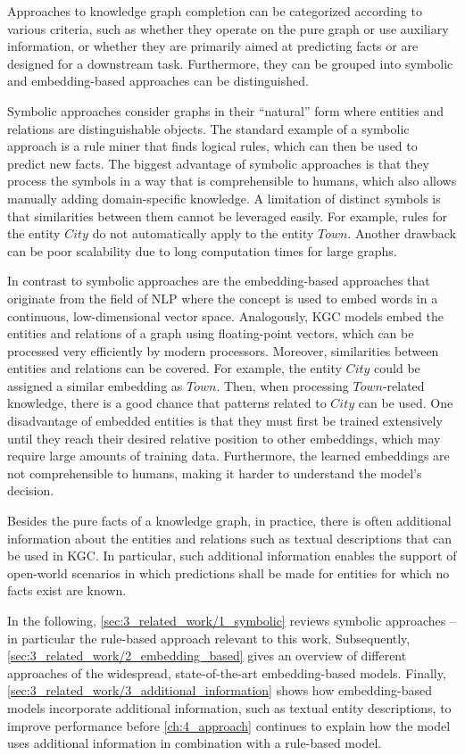 Approaches to knowledge graph completion can be categorized according to various criteria, such as whether they operate on the pure graph or use auxiliary information, or whether they are primarily aimed at predicting facts or are designed for a downstream task. Furthermore, they can be grouped into symbolic and embedding-based approaches can be distinguished.

Symbolic approaches consider graphs in their ``natural'' form where entities and relations are distinguishable objects. The standard example of a symbolic approach is a rule miner that finds logical rules, which can then be used to predict new facts. The biggest advantage of symbolic approaches is that they process the symbols in a way that is comprehensible to humans, which also allows manually adding domain-specific knowledge. A limitation of distinct symbols is that similarities between them cannot be leveraged easily. For example, rules for the entity $City$ do not automatically apply to the entity $Town$. Another drawback can be poor scalability due to long computation times for large graphs.

In contrast to symbolic approaches are the embedding-based approaches that originate from the field of NLP where the concept is used to embed words in a continuous, low-dimensional vector space. Analogously, KGC models embed the entities and relations of a graph using floating-point vectors, which can be processed very efficiently by modern processors. Moreover, similarities between entities and relations can be covered. For example, the entity $City$ could be assigned a similar embedding as $Town$. Then, when processing $Town$-related knowledge, there is a good chance that patterns related to $City$ can be used. One disadvantage of embedded entities is that they must first be trained extensively until they reach their desired relative position to other embeddings, which may require large amounts of training data. Furthermore, the learned embeddings are not comprehensible to humans, making it harder to understand the model's decision.

Besides the pure facts of a knowledge graph, in practice, there is often additional information about the entities and relations such as textual descriptions that can be used in KGC. In particular, such additional information enables the support of open-world scenarios in which predictions shall be made for entities for which no facts exist are known.

In the following, \autoref{sec:3_related_work/1_symbolic} reviews symbolic approaches -- in particular the rule-based approach relevant to this work. Subsequently, \autoref{sec:3_related_work/2_embedding_based} gives an overview of different approaches of the widespread, state-of-the-art embedding-based models. Finally, \autoref{sec:3_related_work/3_additional_information} shows how embedding-based models incorporate additional information, such as textual entity descriptions, to improve performance before \autoref{ch:4_approach} continues to explain how the model uses additional information in combination with a rule-based model.



